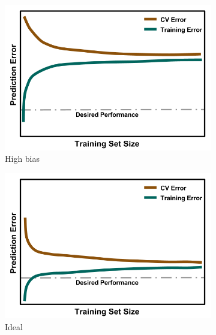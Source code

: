 \begin{figure}[!hp]
  \centering
  \begin{subfigure}[h]{0.65\linewidth}
    \centering
    \includegraphics[width=\linewidth]{./chapters/litrev/LearningCurve-bias.png}
    \caption{High bias}
    \label{fig:bias}
  \end{subfigure}
  \begin{subfigure}[h]{0.65\linewidth}
    \centering
    \includegraphics[width=\linewidth]{./chapters/litrev/LearningCurve-ideal.png}
    \caption{Ideal}
    \label{fig:ideal}
  \end{subfigure}
  \begin{subfigure}[h]{0.65\linewidth}
    \centering

\end{subfigure}
\end{figure}
